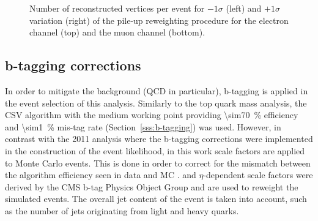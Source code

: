 \begin{figure}[!htpb]
    \caption[Number of reconstructed vertices per event for $\pm1\sigma$ variations of the pile-up reweighting
    procedure]{Number of reconstructed vertices per event for $-1\sigma$ (left) and $+1\sigma$ variation (right) of the
    pile-up reweighting procedure for the electron channel (top) and the muon channel (bottom).}
    \label{fig:pileup_vertices_variations}
\end{figure}


\subsection{b-tagging corrections}
\label{ss_xsection:btagging_corrections}
In order to mitigate the background (QCD in particular), b-tagging is applied in the event selection of this analysis.
Similarly to the top quark mass analysis, the CSV algorithm with the medium working point providing
\SI{\sim70}{\percent} efficiency and \SI{\sim1}{\percent} mis-tag rate (Section~\ref{sss:b-tagging}) was used. However,
in contrast with the 2011 analysis where the b-tagging corrections were implemented in the construction of the event
likelihood, in this work scale factors are applied to Monte Carlo events. This is done in order to correct for the
mismatch between the algorithm efficiency seen in data and MC \autocite{btagging_CMS_8TeV_results}. \pt and
$\eta$-dependent scale factors were derived by the CMS b-tag Physics Object Group \autocite{btag_weights_2011} and are
used to reweight the simulated events. The overall jet content of the event is taken into account, such as the number of
jets originating from light and heavy quarks.

